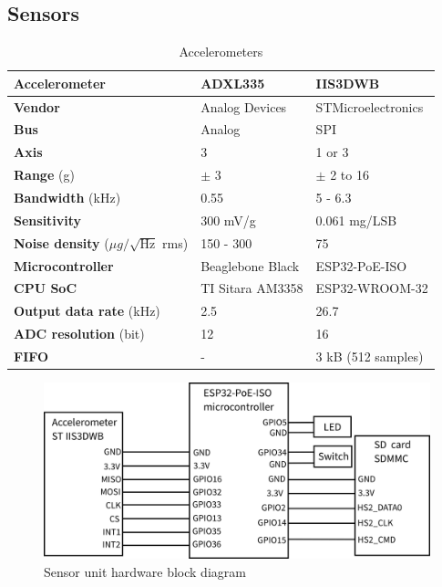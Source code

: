 \subsection{Sensors}

\begin{table}[ht]
\renewcommand{\arraystretch}{1.2}
\begin{tabular}{|l|l|l|}
\hline
\textbf{Accelerometer}                           & \textbf{ADXL335} & \textbf{IIS3DWB}   \\ \hline
\textbf{Vendor}                                  & Analog Devices   & STMicroelectronics \\ \hline
\textbf{Bus}                                     & Analog           & SPI                \\ \hline
\textbf{Axis}                                    & 3                & 1 or 3             \\ \hline
\textbf{Range} (g)                               & $\pm$ 3          & $\pm$ 2 to 16      \\ \hline
\textbf{Bandwidth} (kHz)                         & 0.55             & 5 - 6.3            \\ \hline
\textbf{Sensitivity}                             & 300 mV/g         & 0.061 mg/LSB       \\ \hline
\textbf{Noise density} ($\mu g / \sqrt{\mathrm{Hz}}$ rms) & 150 - 300        & 75                 \\ \hline
\textbf{Microcontroller}                         & Beaglebone Black & ESP32-PoE-ISO      \\ \hline
\textbf{CPU SoC}                                 & TI Sitara AM3358 & ESP32-WROOM-32     \\ \hline
\textbf{Output data rate} (kHz)                  & 2.5              & 26.7               \\ \hline
\textbf{ADC resolution} (bit)                    & 12               & 16                 \\ \hline
\textbf{FIFO}                                    & -                & 3 kB (512 samples) \\ \hline
\end{tabular}
\caption{Accelerometers}
\end{table}


\begin{figure}[h]
	\centering
	\includegraphics[width=\textwidth]{assets/design/hw-block-schematic.png}
	\caption{Sensor unit hardware block diagram}
\end{figure}


